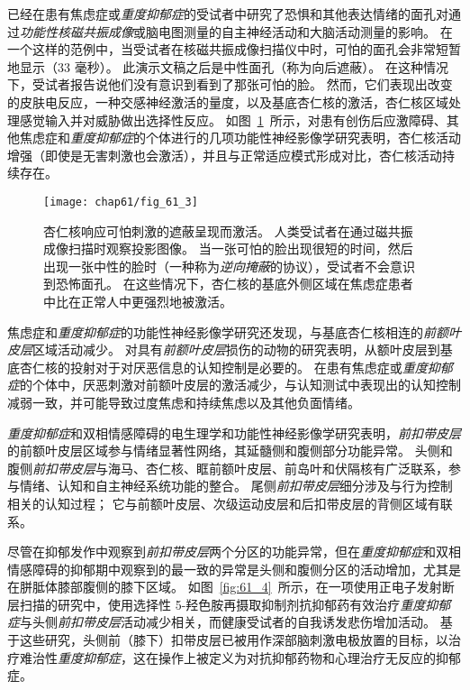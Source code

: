 已经在患有焦虑症或\textit{重度抑郁症}的受试者中研究了恐惧和其他表达情绪的面孔对通过\textit{功能性核磁共振成像}或脑电图测量的自主神经活动和大脑活动测量的影响。
在一个这样的范例中，当受试者在核磁共振成像扫描仪中时，可怕的面孔会非常短暂地显示（33 毫秒）。
此演示文稿之后是中性面孔（称为向后遮蔽）。
在这种情况下，受试者报告说他们没有意识到看到了那张可怕的脸。
然而，它们表现出改变的皮肤电反应，一种交感神经激活的量度，以及基底杏仁核的激活，杏仁核区域处理感觉输入并对威胁做出选择性反应。
如图~\ref{fig:61_3}~所示，对患有创伤后应激障碍、其他焦虑症和\textit{重度抑郁症}的个体进行的几项功能性神经影像学研究表明，杏仁核活动增强（即使是无害刺激也会激活），并且与正常适应模式形成对比，杏仁核活动持续存在。


\begin{figure}[htbp]
	\centering
	\texttt{[image: chap61/fig\_61\_3]}
	\caption{杏仁核响应可怕刺激的遮蔽呈现而激活。
		人类受试者在通过磁共振成像扫描时观察投影图像。
		当一张可怕的脸出现很短的时间，然后出现一张中性的脸时（一种称为\textit{逆向掩蔽}的协议），受试者不会意识到恐怖面孔。
		在这些情况下，杏仁核的基底外侧区域在焦虑症患者中比在正常人中更强烈地被激活\cite{etkin2004individual}。}
	\label{fig:61_3}
\end{figure}


焦虑症和\textit{重度抑郁症}的功能性神经影像学研究还发现，与基底杏仁核相连的\textit{前额叶皮层}区域活动减少。
对具有\textit{前额叶皮层}损伤的动物的研究表明，从额叶皮层到基底杏仁核的投射对于对厌恶信息的认知控制是必要的。
在患有焦虑症或\textit{重度抑郁症}的个体中，厌恶刺激对前额叶皮层的激活减少，与认知测试中表现出的认知控制减弱一致，并可能导致过度焦虑和持续焦虑以及其他负面情绪。


\textit{重度抑郁症}和双相情感障碍的电生理学和功能性神经影像学研究表明，\textit{前扣带皮层}的前额叶皮层区域参与情绪显著性网络，其延髓侧和腹侧部分功能异常。
头侧和腹侧\textit{前扣带皮层}与海马、杏仁核、眶前额叶皮层、前岛叶和伏隔核有广泛联系，参与情绪、认知和自主神经系统功能的整合。
尾侧\textit{前扣带皮层}细分涉及与行为控制相关的认知过程；
它与前额叶皮层、次级运动皮层和后扣带皮层的背侧区域有联系。


尽管在抑郁发作中观察到\textit{前扣带皮层}两个分区的功能异常，但在\textit{重度抑郁症}和双相情感障碍的抑郁期中观察到的最一致的异常是头侧和腹侧分区的活动增加，尤其是在胼胝体膝部腹侧的膝下区域。
如图~\ref{fig:61_4}~所示，在一项使用正电子发射断层扫描的研究中，使用选择性 5-羟色胺再摄取抑制剂抗抑郁药有效治疗\textit{重度抑郁症}与头侧\textit{前扣带皮层}活动减少相关，而健康受试者的自我诱发悲伤增加活动。
基于这些研究，头侧前（膝下）扣带皮层已被用作深部脑刺激电极放置的目标，以治疗难治性\textit{重度抑郁症}，这在操作上被定义为对抗抑郁药物和心理治疗无反应的抑郁症。


